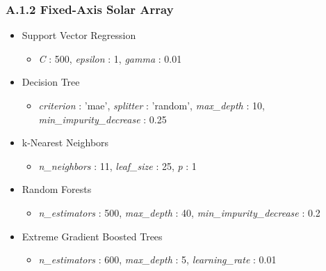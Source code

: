 \subsubsection*{A.1.2 \hspace{0.5em} Fixed-Axis Solar Array}
\begin{itemize}
    \item Support Vector Regression
    \begin{itemize}
        \item \textit{C} : 500, \textit{epsilon} : 1,  \textit{gamma} : 0.01
    \end{itemize}

    \item Decision Tree 
    \begin{itemize}
        \item \textit{criterion} : 'mae', \textit{splitter} : 'random', \textit{max\_depth} : 10, \textit{min\_impurity\_decrease} : 0.25
    \end{itemize}

    \item k-Nearest Neighbors 
    \begin{itemize}
        \item \textit{n\_neighbors} : 11, \textit{leaf\_size} : 25, \textit{p} : 1
    \end{itemize}

    \item Random Forests 
    \begin{itemize}
        \item \textit{n\_estimators} : 500, \textit{max\_depth} : 40, \textit{min\_impurity\_decrease} : 0.2
    \end{itemize}

    \item Extreme Gradient Boosted Trees
    \begin{itemize}
        \item \textit{n\_estimators} : 600, \textit{max\_depth} : 5, \textit{learning\_rate} : 0.01 
    \end{itemize}

\end{itemize}

